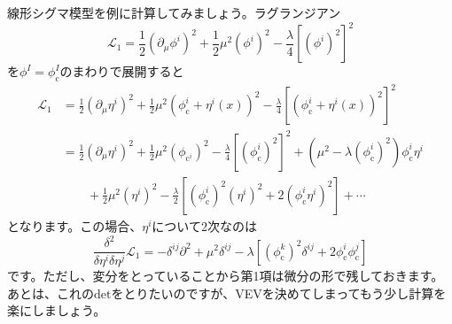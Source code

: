 \documentclass[unicode,a4paper,11pt]{ltjsarticle}
\theoremstyle{definition}
\begin{document}
線形シグマ模型を例に計算してみましょう。ラグランジアン
\begin{equation}
   \mathcal{L}_{1}
   =
   \frac{1}{2}(\partial_{\mu}\phi^{i})^2
   +
   \frac{1}{2}\mu^2 (\phi^{i})^2
   -
   \frac{\lambda}{4}[(\phi^{i})^2]^2
\end{equation}
を$\phi^{I}=\phi_{\mathrm{c}}^{I}$のまわりで展開すると
\begin{align}
   \mathcal{L}_{1}
    & =
   \frac{1}{2}(\partial_{\mu}\eta^{i})^2
   +
   \frac{1}{2}\mu^2 (\phi_{\mathrm{c}}^{i}+\eta^{i}(x))^2
   -
   \frac{\lambda}{4}[(\phi_{\mathrm{c}}^{i}+\eta^{i}(x))^2]^2
   \nonumber
   \\
    & =
   \frac{1}{2}(\partial_{\mu}\eta^{i})^2
   +
   \frac{1}{2}\mu^2(\phi_{\mathrm{c}^{i}})^2
   -
   \frac{\lambda}{4}[(\phi_{\mathrm{c}}^{i})^2]^2
   +
   (\mu^2-\lambda(\phi_{\mathrm{c}}^{i})^2)\phi_{\mathrm{c}}^{i}\eta^{i}
   \nonumber
   \\
    & \qquad
   +
   \frac{1}{2}\mu^2(\eta^{i})^2
   -
   \frac{\lambda}{2}[(\phi_{\mathrm{c}}^{i})^2(\eta^{i})^2+2(\phi_{\mathrm{c}}^{i}\eta^{i})^2]
   +
   \cdots
\end{align}
となります。この場合、$\eta^{i}$について2次なのは
\begin{equation}
   \frac{\delta^{2}}{\delta\eta^{i}\delta\eta^{j}}\mathcal{L}_{1}
   =
   -
   \delta^{ij}\partial^{2}
   +
   \mu^2\delta^{ij}
   -
   \lambda[(\phi_{\mathrm{c}}^{k})^2\delta^{ij}+2\phi_{\mathrm{c}}^{i}\phi_{\mathrm{c}}^{j}]
\end{equation}
です。ただし、変分をとっていることから第1項は微分の形で残しておきます。あとは、これの$\mathrm{det}$をとりたいのですが、VEVを決めてしまってもう少し計算を楽にしましょう。
\end{document}
